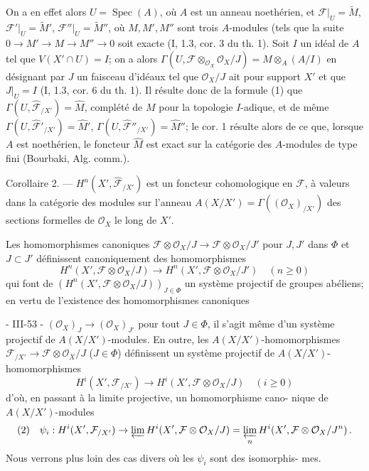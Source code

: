 On a en effet alors $U = \operatorname{Spec}(A)$, où $A$ est un anneau noethérien, et $\mathcal{F}|_U = \tilde{M}$, $\mathcal{F}'|_U = \tilde{M}'$, $\mathcal{F}''|_U = \tilde{M}''$, où $M, M', M''$ sont trois $A$-modules (tels que la suite $0 \to M' \to M \to M'' \to 0$ soit exacte (I, 1.3, cor. 3 du th. 1). Soit $I$ un idéal de $A$ tel que $V(X' \cap U) = I$; on a alors
$\Gamma(U, \mathcal{F} \otimes_{\mathcal{O}_X} \mathcal{O}_X/J) = M \otimes_A (A/I)$ en désignant par $J$ un faisceau d'idéaux tel que $\mathcal{O}_X/J$ ait pour support $X'$ et que $J|_U = I$ (I, 1.3, cor. 6 du th. 1). Il résulte donc de la formule (1) que $\Gamma(U, \widehat{\mathcal{F}}_{/X'}) = \hat{M}$, complété de $M$ pour la topologie $I$-adique, et de même $\Gamma(U, \widehat{\mathcal{F}}'_{/X'}) = \hat{M}'$, $\Gamma(U, \widehat{\mathcal{F}}''_{/X'}) = \hat{M}''$; le cor. 1 résulte alors de ce que, lorsque $A$ est noethérien, le foncteur $\hat{M}$ est exact sur la catégorie des $A$-modules de type fini (Bourbaki, Alg. comm.).

Corollaire 2. — $H^n(X', \widehat{\mathcal{F}}_{/X'})$ est un foncteur cohomologique en $\mathcal{F}$, à valeurs dans la catégorie des modules sur l'anneau $A(X/X') = \Gamma((\mathcal{O}_X)_{/X'})$ des sections formelles de $\mathcal{O}_X$ le long de $X'$.

Les homomorphismes canoniques $\mathcal{F} \otimes \mathcal{O}_X/J \to \mathcal{F} \otimes \mathcal{O}_X/J'$ pour $J, J'$ dans $\Phi$ et $J \subset J'$ définissent canoniquement des homomorphismes
$$H^n(X', \mathcal{F} \otimes \mathcal{O}_X/J) \to H^n(X', \mathcal{F} \otimes \mathcal{O}_X/J') \quad (n \ge 0)$$
qui font de $(H^n(X', \mathcal{F} \otimes \mathcal{O}_X/J))_{J \in \Phi}$ un système projectif de groupes abéliens; en vertu de l'existence des homomorphismes canoniques

\newpage


- III-53 -
$(\mathcal{O}_X)_J \to (\mathcal{O}_X)_{J'}$ pour tout $J \in \Phi$, il s'agit même d'un système projectif
de $A(X/X')$-modules. En outre, les $A(X/X')$-homomorphismes
$\mathcal{F}_{/X'} \to \mathcal{F} \otimes \mathcal{O}_X/J$ ($J \in \Phi$) définissent un
système projectif de $A(X/X')$-homomorphismes
$$H^i(X', \mathcal{F}_{/X'}) \to H^i(X', \mathcal{F} \otimes \mathcal{O}_X/J) \quad (i \ge 0)$$
d'où, en passant à la limite projective, un homomorphisme cano-
nique de $A(X/X')$-modules
$$(2) \quad \psi_i : H^i(X', \mathcal{F}_{/X'}) \to \varprojlim H^i(X', \mathcal{F} \otimes \mathcal{O}_X/J) = \varprojlim_n H^i(X', \mathcal{F} \otimes \mathcal{O}_X/J^n) \, .$$
Nous verrons plus loin des cas divers où les $\psi_i$ sont des isomorphis-
mes.

